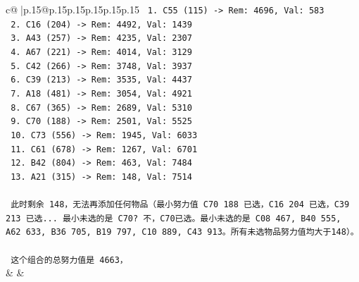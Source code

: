 \documentclass{article}
\begin{document}
{\begin{supertabular}{c@{$\;$}|p{.15\linewidth}@{}p{.15\linewidth}p{.15\linewidth}p{.15\linewidth}p{.15\linewidth}p{.15\linewidth}}
{{{\texttt{   1. C55 (115) {-}> Rem: 4696, Val: 583} \\
\texttt{   2. C16 (204) {-}> Rem: 4492, Val: 1439} \\
\texttt{   3. A43 (257) {-}> Rem: 4235, Val: 2307} \\
\texttt{   4. A67 (221) {-}> Rem: 4014, Val: 3129} \\
\texttt{   5. C42 (266) {-}> Rem: 3748, Val: 3937} \\
\texttt{   6. C39 (213) {-}> Rem: 3535, Val: 4437} \\
\texttt{   7. A18 (481) {-}> Rem: 3054, Val: 4921} \\
\texttt{   8. C67 (365) {-}> Rem: 2689, Val: 5310} \\
\texttt{   9. C70 (188) {-}> Rem: 2501, Val: 5525} \\
\texttt{   10. C73 (556) {-}> Rem: 1945, Val: 6033} \\
\texttt{   11. C61 (678) {-}> Rem: 1267, Val: 6701} \\
\texttt{   12. B42 (804) {-}> Rem: 463, Val: 7484} \\
\texttt{   13. A21 (315) {-}> Rem: 148, Val: 7514} \\
\\ 
\texttt{   此时剩余 148，无法再添加任何物品（最小努力值 C70 188 已选，C16 204 已选，C39 213 已选... 最小未选的是 C70? 不，C70已选。最小未选的是 C08 467, B40 555, A62 633, B36 705, B19 797, C10 889, C43 913。所有未选物品努力值均大于148）。} \\
\\ 
\texttt{   这个组合的总努力值是 4663，} \\
            }
        }
    }
    & & \\ \\


\end{supertabular}}
\end{document}
